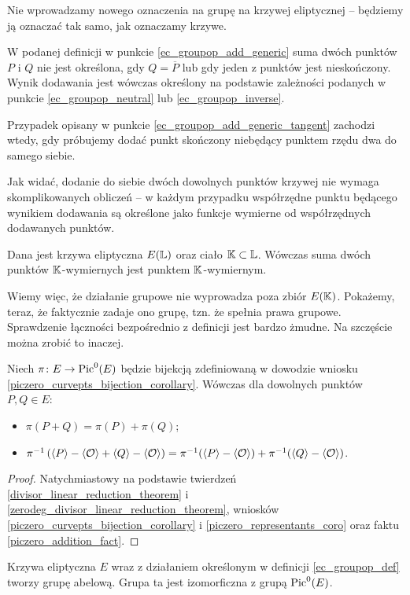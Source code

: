 \begin{remark}
Nie wprowadzamy nowego oznaczenia na grupę na krzywej eliptycznej --
będziemy ją oznaczać tak samo, jak oznaczamy krzywe.
\end{remark}

\begin{remark}
W podanej definicji w punkcie \ref{ec_groupop_add_generic}
suma dwóch punktów $P$ i $Q$
nie jest określona, gdy $Q = \overline{P}$
lub gdy jeden z punktów jest nieskończony.
Wynik dodawania jest wówczas określony
na podstawie zależności podanych w punkcie
\ref{ec_groupop_neutral} lub \ref{ec_groupop_inverse}.
\end{remark}

\begin{remark}
Przypadek opisany w punkcie \ref{ec_groupop_add_generic_tangent}
zachodzi wtedy,
gdy próbujemy dodać punkt skończony niebędący punktem rzędu dwa
do samego siebie.
\end{remark}

Jak widać, dodanie do siebie dwóch dowolnych punktów krzywej
nie wymaga skomplikowanych obliczeń --
w każdym przypadku współrzędne punktu będącego wynikiem dodawania
są określone jako funkcje wymierne od współrzędnych dodawanych punktów.

\begin{fact}
Dana jest krzywa eliptyczna $E(\mathbb{L})$ oraz ciało $\mathbb{K} \subset \mathbb{L}$.
Wówczas suma dwóch punktów $\mathbb{K}$-wymiernych jest punktem $\mathbb{K}$-wymiernym.
\end{fact}

Wiemy więc, że działanie grupowe nie wyprowadza poza zbiór $E(\mathbb{K})$.
Pokażemy, teraz, że faktycznie zadaje ono grupę,
tzn. że spełnia prawa grupowe.
Sprawdzenie łączności bezpośrednio z definicji jest bardzo żmudne.
Na szczęście można zrobić to inaczej.

\begin{theorem}
Niech $\pi \colon E \to \operatorname{Pic}^0(E)$
będzie bijekcją zdefiniowaną w dowodzie wniosku
\ref{piczero_curvepts_bijection_corollary}.
Wówczas dla dowolnych punktów $P, Q \in E$:
\begin{itemize}
\item $\pi(P + Q) = \pi(P) + \pi(Q)$;
\item
$\pi^{-1}\left(
\langle P\rangle - \langle\mathcal{O}\rangle
+ \langle Q\rangle - \langle\mathcal{O}\rangle
\right)
=
\pi^{-1}(\langle P\rangle - \langle\mathcal{O}\rangle)
+
\pi^{-1}(\langle Q\rangle - \langle\mathcal{O}\rangle)$.
\end{itemize}
\end{theorem}

\begin{proof}
Natychmiastowy na podstawie
twierdzeń
\ref{divisor_linear_reduction_theorem}
i \ref{zerodeg_divisor_linear_reduction_theorem},
wniosków \ref{piczero_curvepts_bijection_corollary}
i \ref{piczero_representants_coro}
oraz faktu \ref{piczero_addition_fact}.
\end{proof}

\begin{corollary}
Krzywa eliptyczna $E$ wraz z działaniem określonym w definicji
\ref{ec_groupop_def} tworzy grupę abelową.
Grupa ta jest izomorficzna z grupą $\operatorname{Pic}^0(E)$.
\end{corollary}
